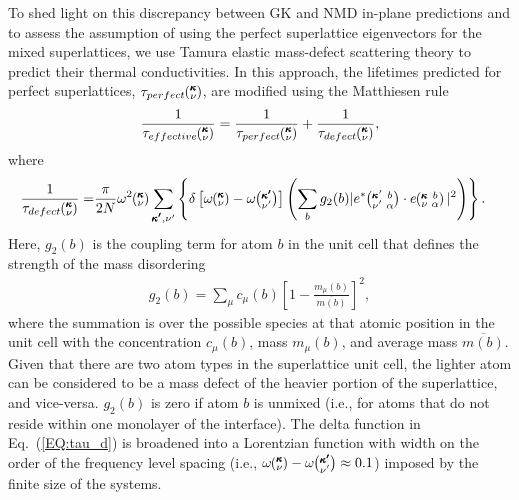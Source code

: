 \documentclass[aps,prb,preprint,preprintnumbers,amsmath,amssymb,floatfix,superscriptaddress]{revtex4}
\newcommand{\kvba}{\mspace{-4.0mu}\left(\mspace{-8.0mu}
\begin{smallmatrix} &\pmb{\kappa} &b \\ &\nu &\alpha\end{smallmatrix}
\mspace{-3.0mu}\right)}
\newcommand{\kvbap}{\mspace{-4.0mu}\left(\mspace{-8.0mu}
\begin{smallmatrix} &\pmb{\kappa}' &b \\ &\nu' &\alpha\end{smallmatrix}
\mspace{-3.0mu}\right)}
\newcommand{\kv}{\mspace{-4.0mu}\left(\mspace{-8.0mu}
\begin{smallmatrix}&\pmb{\kappa} \\&\nu\end{smallmatrix}
\mspace{-3.0mu}\right)}
\newcommand{\kvp}{\mspace{-4.0mu}\left(\mspace{-8.0mu}
\begin{smallmatrix}&\pmb{\kappa'} \\&\nu'\end{smallmatrix}
\mspace{-3.0mu}\right)}
\begin{document}
To shed light on this discrepancy between GK and NMD in-plane predictions and to assess the assumption of using the perfect superlattice eigenvectors for the mixed superlattices, we use Tamura elastic mass-defect scattering theory to predict their thermal conductivities. \cite{tamura_isotope_1983,PhysRevB.87.140302,Luckyanova16112012} In this approach, the lifetimes predicted for perfect superlattices, $\tau_{perfect}\kv$, are modified using the Matthiesen rule %
\begin{equation}\label{EQ:tau_eff}
\begin{split}
\frac{1}{\tau_{effective}\kv} = \frac{1}{\tau_{perfect}\kv} +\frac{1}{\tau_{defect}\kv},
\end{split}
\end{equation}
where
\begin{equation}\label{EQ:tau_d}
\begin{split}
\frac{1}{\tau_{defect}\kv} = &\frac{\pi}{2N}\omega^2\kv \sum_{\pmb{\kappa'},\nu'} \left\{ \delta\left[ \omega\kv - \omega\kvp \right]
\left (\sum_{b} g_2(b) |e^*\kvbap \cdot e\kvba |^2 \right )\right \} .
\end{split}
\end{equation}
Here, $g_2(b)$ is the coupling term for atom $b$ in the unit cell that defines the strength of the mass disordering
\begin{equation}\label{EQ:g(b)}
\begin{split}
g_2(b) = \sum_\mu c_{\mu}(b)\left[1-\frac{m_{\mu}(b)}{\overline{m(b)}}\right]^2, 
\end{split}
\end{equation}
where the summation is over the possible species at that atomic position in the unit cell with the concentration $c_\mu(b)$, mass $m_\mu(b)$, and average mass $\overline{m(b)}$. Given that there are two atom types in the superlattice unit cell, the lighter atom can be considered to be a mass defect of the heavier portion of the superlattice, and vice-versa. $g_2(b)$ is zero if atom $b$ is unmixed (i.e., for atoms that do not reside within one monolayer of the interface). The delta function in Eq.~(\ref{EQ:tau_d}) is broadened into a Lorentzian function with width on the order of the frequency level spacing (i.e., $\omega \kv -\omega \kvp \approx 0.1$) imposed by the finite size of the systems.\cite{allen_thermal_1993}
\end{document}
